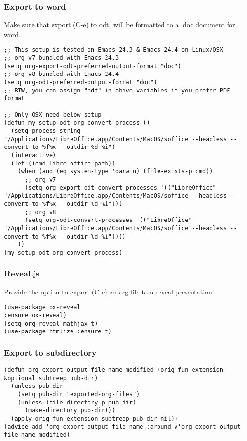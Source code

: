 \documentclass[11pt]{article}
\begin{document}
\subsubsection{Export to word}
\label{sec:org3bba3ac}
Make sure that export (C-e) to odt, will be formatted to a .doc document for word.
\begin{verbatim}
;; This setup is tested on Emacs 24.3 & Emacs 24.4 on Linux/OSX
;; org v7 bundled with Emacs 24.3
(setq org-export-odt-preferred-output-format "doc")
;; org v8 bundled with Emacs 24.4
(setq org-odt-preferred-output-format "doc")
;; BTW, you can assign "pdf" in above variables if you prefer PDF format

;; Only OSX need below setup
(defun my-setup-odt-org-convert-process ()
  (setq process-string "/Applications/LibreOffice.app/Contents/MacOS/soffice --headless --convert-to %f%x --outdir %d %i")
  (interactive)
  (let ((cmd libre-office-path))
    (when (and (eq system-type 'darwin) (file-exists-p cmd))
      ;; org v7
      (setq org-export-odt-convert-processes '(("LibreOffice" "/Applications/LibreOffice.app/Contents/MacOS/soffice --headless --convert-to %f%x --outdir %d %i")))
      ;; org v8
      (setq org-odt-convert-processes '(("LibreOffice"  "/Applications/LibreOffice.app/Contents/MacOS/soffice --headless --convert-to %f%x --outdir %d %i"))))
    ))
(my-setup-odt-org-convert-process)
\end{verbatim}
\subsubsection{Reveal.js}
\label{sec:org50bf3bb}
Provide the option to export (C-e) an org-file to a reveal presentation.
\begin{verbatim}
(use-package ox-reveal
:ensure ox-reveal)
(setq org-reveal-mathjax t)
(use-package htmlize :ensure t)
\end{verbatim}
\subsubsection{Export to subdirectory}
\label{sec:org18979b4}
\begin{verbatim}
(defun org-export-output-file-name-modified (orig-fun extension &optional subtreep pub-dir)
  (unless pub-dir
    (setq pub-dir "exported-org-files")
    (unless (file-directory-p pub-dir)
      (make-directory pub-dir)))
  (apply orig-fun extension subtreep pub-dir nil))
(advice-add 'org-export-output-file-name :around #'org-export-output-file-name-modified)
\end{verbatim}
\end{document}
